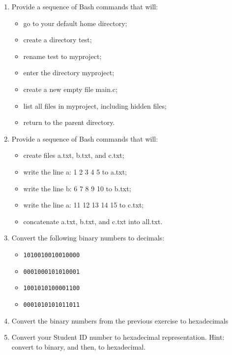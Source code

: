 \documentclass[11pt]{article}
\begin{document}
\begin{enumerate}[leftmargin=*]

\item Provide a sequence of Bash commands that will:
    \begin{itemize}
        \item go to your default home directory;
        \item create a directory test;
        \item rename test to myproject;
        \item enter the directory myproject;
        \item create a new empty file main.c;
        \item list all files in myproject, including hidden files;
        \item return to the parent directory.
    \end{itemize}

\item Provide a sequence of Bash commands that will:
    \begin{itemize}
        \item create files a.txt, b.txt, and c.txt;
        \item write the line a: 1 2 3 4 5 to a.txt;
        \item write the line b: 6 7 8 9 10 to b.txt;
        \item write the line a: 11 12 13 14 15 to c.txt;
        \item concatenate a.txt, b.txt, and c.txt into all.txt.
    \end{itemize}

\item Convert the following binary numbers to decimals:
    \begin{itemize}
        \item \verb|1010010010010000|
        \item \verb|0001000101010001|
        \item \verb|1001010100001100|
        \item \verb|0001010101011011|
    \end{itemize}

\item Convert the binary numbers from the previous exercise to hexadecimals

\item Convert your Student ID number to hexadecimal representation. Hint: convert to binary, and then, to hexadecimal.


\end{enumerate}
\end{document}
